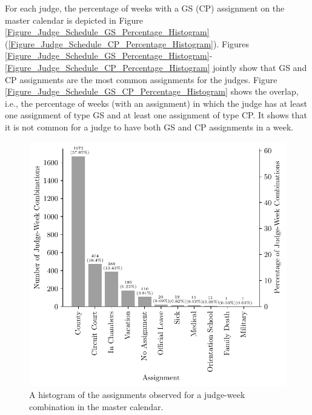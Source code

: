 \documentclass[11pt, oneside]{article}   	%
\theoremstyle{ModifiedStyle}
\begin{document}
For each judge, the percentage of weeks with a GS (CP) assignment on the master calendar is depicted in Figure \ref{Figure_Judge_Schedule_GS_Percentage_Histogram} (\ref{Figure_Judge_Schedule_CP_Percentage_Histogram}). Figures \ref{Figure_Judge_Schedule_GS_Percentage_Histogram}-\ref{Figure_Judge_Schedule_CP_Percentage_Histogram} jointly show that GS and CP assignments are the most common assignments for the judges. Figure \ref{Figure_Judge_Schedule_GS_CP_Percentage_Histogram} shows the overlap, i.e., the percentage of weeks (with an assignment) in which the judge has at least one assignment of type GS and at least one assignment of type CP. It shows that it is not common for a judge to have both GS and CP assignments in a week.

\begin{figure}[H]
	\centering
	\hspace*{-8mm}
	\begin{minipage}{.45\textwidth}
		\centering
		\hspace*{-10mm}
		\includegraphics[scale=0.67]{Figures/Type_of_Assignment_Histogram}
		\vspace*{-7mm}
		\caption{A histogram of the assignments observed for a judge-week combination in the master calendar.}
		\label{Figure_Assignment_Histogram}
	\end{minipage}
	\hspace{5mm}
	\begin{minipage}{0.45\textwidth}

\end{minipage}
\end{figure}
\end{document}
